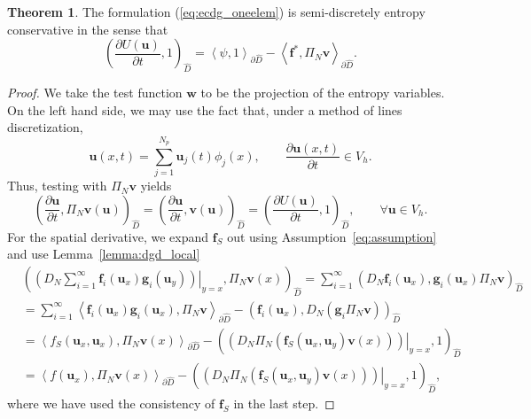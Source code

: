 \documentclass[preprint,10pt]{article}
\theoremstyle{definition}
\theoremstyle{lemma}
\theoremstyle{theorem}
\newtheorem{theorem}{Theorem}
\theoremstyle{assumption}
\newcommand{\pd}[2]{\frac{\partial#1}{\partial#2}}
\newcommand{\LRp}[1]{\left( #1 \right)}
\newcommand{\LRa}[1]{\left\langle #1 \right\rangle}
\begin{document}
\begin{theorem}
The formulation (\ref{eq:ecdg_oneelem})
 is semi-discretely entropy conservative in the sense that
\[
\LRp{\pd{U(\bm{u})}{t},1}_{\widehat{D}} =  \LRa{\psi,1}_{\partial \widehat{D}}-\LRa{{\bm{f}^*, \Pi_N\bm{v}}}_{\partial \widehat{D}}.
\]
\label{lemma:ec1}
\end{theorem}
\begin{proof}
We take the test function $\bm{w}$ to be the projection of the entropy variables.  On the left hand side, we may use the fact that, under a method of lines discretization, 
\[
\bm{u}(x,t) = \sum_{j=1}^{N_p} \bm{u}_j(t) \phi_j(x), \qquad \pd{\bm{u}(x,t)}{t} \in V_h.
\]
Thus, testing with $\Pi_N \bm{v}$ yields 
\[
\LRp{\pd{\bm{u}}{t}, \Pi_N \bm{v}(\bm{u})}_{\widehat{D}} = \LRp{\pd{\bm{u}}{t},\bm{v}(\bm{u})}_{\widehat{D}} = \LRp{\pd{U(\bm{u})}{t},1}_{\widehat{D}}, \qquad \forall \bm{u}\in V_h.
\]
For the spatial derivative, we expand $\bm{f}_S$ out using Assumption~\ref{eq:assumption} and use Lemma~\ref{lemma:dgd_local}
\begin{align*}
&\LRp{\left.\LRp{D_N \sum_{i=1}^{\infty}\bm{f}_i(\bm{u}_x)\bm{g}_i(\bm{u}_y)}\right|_{y=x}, \Pi_N\bm{v}(x)}_{\widehat{D}} = \sum_{i=1}^{\infty} \LRp{{D_N \bm{f}_i(\bm{u}_x)}, {\bm{g}_i(\bm{u}_x)\Pi_N\bm{v} }}_{\widehat{D}}\\
&= \sum_{i=1}^{\infty}\LRa{\bm{f}_i(\bm{u}_x) \bm{g}_i(\bm{u}_x),\Pi_N\bm{v}}_{\partial \widehat{D}}  - \LRp{ \bm{f}_i(\bm{u}_x), D_N \LRp{\bm{g}_i\Pi_N\bm{v} }}_{\widehat{D}}\\
&= \LRa{f_S(\bm{u}_x,\bm{u}_x), \Pi_N\bm{v}(x)}_{\partial \widehat{D}}  - \LRp{\left.\LRp{D_N \Pi_N\LRp{\bm{f}_S(\bm{u}_x,\bm{u}_y)\bm{v}(x)} }\right|_{y=x},1}_{\widehat{D}}\\
&= \LRa{f(\bm{u}_x), \Pi_N\bm{v}(x)}_{\partial \widehat{D}}  - \LRp{\left.\LRp{D_N \Pi_N\LRp{\bm{f}_S(\bm{u}_x,\bm{u}_y)\bm{v}(x)} }\right|_{y=x},1}_{\widehat{D}},
\end{align*}
where we have used the consistency of $\bm{f}_S$ in the last step.  

\end{proof}
\end{document}
